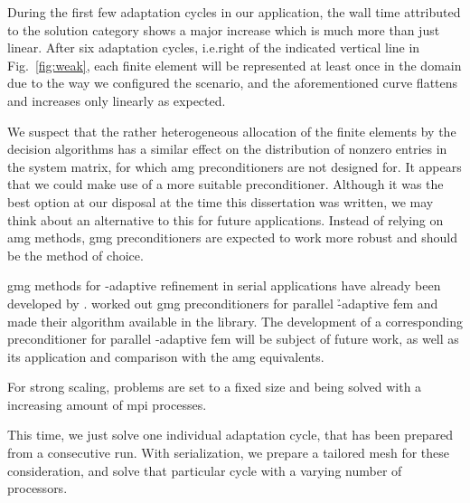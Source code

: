 During the first few adaptation cycles in our application, the wall time attributed to the solution category shows a major increase which is much more than just linear. After six adaptation cycles, i.e.\@ right of the indicated vertical line in Fig.~\ref{fig:weak}, each finite element will be represented at least once in the domain due to the way we configured the scenario, and the aforementioned curve flattens and increases only linearly as expected.



We suspect that the rather heterogeneous allocation of the finite elements by the decision algorithms%
has a similar effect on the distribution of nonzero entries in the system matrix, for which \gls{amg} preconditioners are not designed for. It appears that we could make use of a more suitable preconditioner. Although it was the best option at our disposal at the time this dissertation was written, we may think about an alternative to this for future applications. Instead of relying on \gls{amg} methods, \gls{gmg} preconditioners are expected to work more robust and should be the method of choice.

\Gls{gmg} methods for \hp-adaptive refinement in serial applications have already been developed by \textcite{mitchell2010}. \textcite{clevenger2019} worked out \gls{gmg} preconditioners for parallel \h-adaptive \gls{fem} and made their algorithm available in the \dealii{} library. The development of a corresponding preconditioner for parallel \hp-adaptive \gls{fem} will be subject of future work, as well as its application and comparison with the \gls{amg} equivalents.



For strong scaling, problems are set to a fixed size and being solved with a increasing amount of \gls{mpi} processes.

This time, we just solve one individual adaptation cycle, that has been prepared from a consecutive run. With serialization, we prepare a tailored mesh for these consideration, and solve that particular cycle with a varying number of processors.

